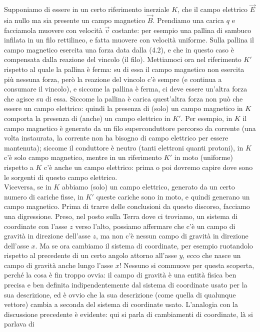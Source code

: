 Supponiamo di essere in un certo riferimento inerziale $K$, che il campo
elettrico $\vec E$ sia nullo ma sia presente un campo magnetico $\vec B$.
Prendiamo una carica $q$ e facciamola muovere con velocit\`a $\vec v$ costante:
per esempio una pallina di sambuco infilata in un filo rettilineo, e fatta
muovere con velocit\`a uniforme. Sulla pallina il campo magnetico esercita una
forza data dalla (4.2), e che in questo caso \`e compensata dalla reazione del
vincolo (il filo). Mettiamoci ora nel riferimento $K'$ rispetto al quale la
pallina \`e ferma: su di essa il campo magnetico non esercita pi\`u nessuna
forza, per\`o la reazione del vincolo c'\`e sempre (e continua a consumare il
vincolo), e siccome la pallina \`e ferma, ci deve essere un'altra forza che
agisce su di essa. Siccome la pallina \`e carica quest'altra forza non pu\`o che
essere un campo elettrico: quindi la presenza di (solo) un
campo magnetico in $K$ comporta la presenza di (anche) un campo elettrico in
$K'$. Per esempio, in $K$ il campo magnetico \`e generato da un filo
superconduttore percorso da corrente (una volta instaurata, la corrente non ha
bisogno di campo elettrico per essere mantenuta); siccome il conduttore \`e
neutro (tanti elettroni quanti protoni), in $K$ c'\`e solo campo magnetico,
mentre in un riferimento $K'$ in moto (uniforme) rispetto a $K$ c'\`e anche un
campo elettrico: prima o poi dovremo capire dove sono le sorgenti di questo
campo elettrico.\\
Viceversa, se in $K$ abbiamo (solo) un campo elettrico, generato da un certo
numero di cariche fisse, in $K'$ queste cariche sono in moto, e quindi generano
un campo magnetico. Prima di trarre delle conclusioni da questo discorso,
facciamo una digressione. Preso, nel posto sulla Terra dove ci troviamo, un
sistema di coordinate con l'asse $z$ verso l'alto, possiamo affermare che c'\`e
un campo di gravit\`a in direzione dell'asse $z$, ma non c'\`e nessun campo di
gravit\`a in direzione dell'asse $x$. Ma se ora cambiamo il sistema di
coordinate, per esempio ruotandolo rispetto al precedente di un certo angolo
attorno all'asse $y$, ecco che nasce un campo di gravit\`a anche lungo l'asse
$x$! Nessuno si commuove per questa scoperta, perch\'e la cosa \`e fin troppo
ovvia: il campo di gravit\`a \`e una entit\`a fisica ben precisa e ben definita
indipendentemente dal sistema di coordinate usato per la sua descrizione, ed \`e
ovvio che la sua descrizione (come quella di qualunque vettore) cambia a seconda
del sistema di coordinate usato. L'analogia con la discussione precedente \`e
evidente: qui si parla di cambiamenti di coordinate, l\`a si parlava di
